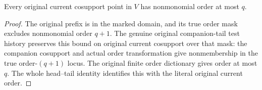 \begin{lemma}
\label{hir:original-frozen-companion-open-order-bound}
\leanok
{}
Every original current cosupport point in $V$ has nonmonomial order at most
$q$.
\end{lemma}
\begin{proof}
The original prefix is in the marked domain, and its true order mask
excludes nonmonomial order $q+1$. The genuine original companion-tail test
history preserves this bound on original current cosupport over that mask:
the companion cosupport and actual order transformation give nonmembership
in the true order-$(q+1)$ locus. The original finite order dictionary gives
order at most $q$. The whole head--tail identity identifies this with the
literal original current order.
\end{proof}

